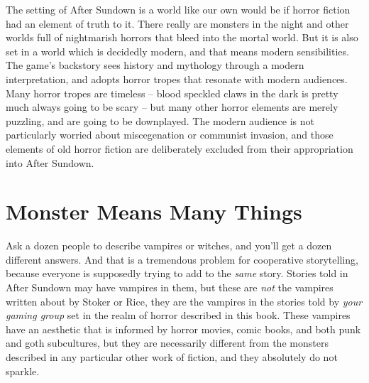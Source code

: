 The setting of After Sundown is a world like our own would be if horror fiction had an element of truth to it. There really are monsters in the night and other worlds full of nightmarish horrors that bleed into the mortal world. But it is also set in a world which is decidedly modern, and that means modern sensibilities. The game's backstory sees history and mythology through a modern interpretation, and adopts horror tropes that resonate with modern audiences. Many horror tropes are timeless -- blood speckled claws in the dark is pretty much always going to be scary -- but many other horror elements are merely puzzling, and are going to be downplayed. The modern audience is not particularly worried about miscegenation or communist invasion, and those elements of old horror fiction are deliberately excluded from their appropriation into After Sundown.

\section{Monster Means Many Things}

Ask a dozen people to describe vampires or witches, and you'll get a dozen different answers. And that is a tremendous problem for cooperative storytelling, because everyone is supposedly trying to add to the \textit{same} story. Stories told in After Sundown may have vampires in them, but these are \textit{not} the vampires written about by Stoker or Rice, they are the vampires in the stories told by \textit{your gaming group} set in the realm of horror described in this book. These vampires have an aesthetic that is informed by horror movies, comic books, and both punk and goth subcultures, but they are necessarily different from the monsters described in any particular other work of fiction, and they absolutely do not sparkle.


